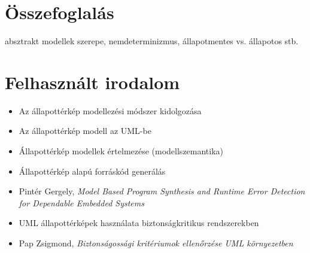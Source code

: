 \begin{fektetett}
\end{fektetett}



\section{Összefoglalás}

absztrakt modellek szerepe, nemdeterminizmus, állapotmentes vs. állapotos stb.

\section*{Felhasznált irodalom}

\begin{itemize}
	\item Az állapottérkép modellezési módszer kidolgozása~\cite{DBLP:journals/scp/Harel87, DBLP:conf/hopl/Harel07}
	\item Az állapottérkép modell az UML-be~\cite{UML}
	\item Állapottérkép modellek értelmezése (modellszemantika)~\cite{DBLP:conf/fmoods/LatellaMM99, DBLP:conf/acsd/DubrovinJ08, DBLP:conf/lics/HarelPSS87}
	\item Állapottérkép alapú forráskód generálás~\cite{samak2008practical}
	\item Pintér Gergely, \emph{Model Based Program Synthesis and Runtime Error Detection for Dependable Embedded Systems}~\cite{PinterGergelyPhD}
	\item UML állapottérképek használata biztonságkritikus rendszerekben~\cite{knight1997formal, DBLP:conf/icre/NobeW96}
	\item Pap Zsigmond, \emph{Biztonságossági kritériumok ellenőrzése UML környezetben}~\cite{PapZsigmondPhD}
\end{itemize}


